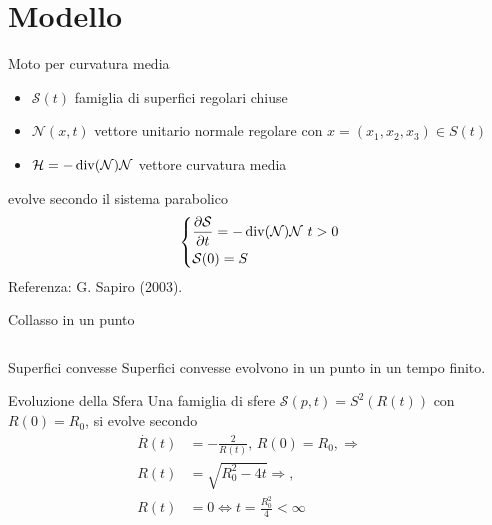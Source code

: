 \section{Modello}
\begin{frame}{Moto per curvatura media}
       \begin{itemize}
       \item $\mathcal{S}(t)$ famiglia di superfici regolari chiuse
       \item $\mathcal{N}(x,t)$ vettore unitario normale regolare con
         $x=(x_1,x_2,x_3)\in S(t)$
       \item $\mathcal{H}=-\operatorname{div}(\mathcal{N})\mathcal{N}$ vettore curvatura media
       \end{itemize}
       evolve secondo il sistema parabolico
       \[
       \left\{
       \begin{aligned}
         &\frac{\partial\mathcal{S}}{\partial t}=-\operatorname{div}(\mathcal{N})\mathcal{N}\text{ $t>0$} \\
         &\mathcal{S}(0)=S
       \end{aligned}
       \right.
       \]
Referenza: G. Sapiro (2003).
\end{frame}

\begin{frame}{Collasso in un punto}
  \begin{columns}[c]
    \begin{column}{6cm}
      \begin{block}{Superfici convesse}
       Superfici convesse  evolvono in un
       punto in un tempo finito.
       \end{block}
      \begin{exampleblock}{Evoluzione della Sfera}
        Una famiglia di sfere $\mathcal{S}(p,t)=S^2(R(t))$ con
        $R(0)=R_0$, si evolve secondo
        \[
        \begin{aligned}
          \overset{\displaystyle.}{R}(t) &= -\frac{2}{R(t)},\,
          R(0)=R_0,\Rightarrow\\
          R(t)&=\sqrt{R_0^2-4t}\Rightarrow, \\
          R(t)&=0 \Longleftrightarrow t=\frac{R_0^2}{4}<\infty 
        \end{aligned}
        \]
      \end{exampleblock}
    \end{column}
    \begin{column}[c]{4cm}
       \begin{center}
     \end{center}
    \end{column}
    \end{columns}
\end{frame}

